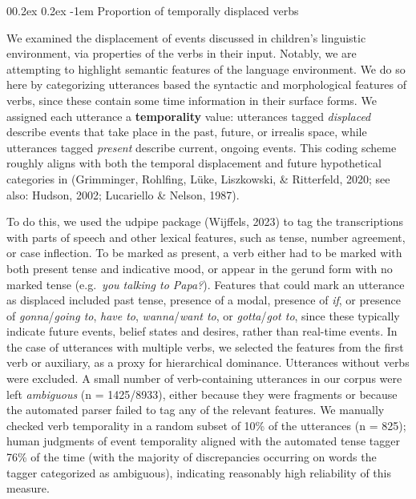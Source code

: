 \documentclass[
  man]{apa6}
\makeatletter
\let\oldparagraph\paragraph
\renewcommand{\paragraph}[1]{\oldparagraph{#1}\mbox{}}
\renewcommand{\paragraph}{\@startsection{paragraph}{4}{\parindent}%
  {0\baselineskip \@plus 0.2ex \@minus 0.2ex}%
  {-1em}%
  {\normalfont\normalsize\bfseries\itshape\typesectitle}}
\makeatother
\begin{document}
\hypertarget{proportion-of-temporally-displaced-verbs}{%
\paragraph{Proportion of temporally displaced verbs}\label{proportion-of-temporally-displaced-verbs}}

We examined the displacement of events discussed in children's linguistic environment, via properties of the verbs in their input. Notably, we are attempting to highlight semantic features of the language environment. We do so here by categorizing utterances based the syntactic and morphological features of verbs, since these contain some time information in their surface forms. We assigned each utterance a \textbf{temporality} value: utterances tagged \emph{displaced} describe events that take place in the past, future, or irrealis space, while utterances tagged \emph{present} describe current, ongoing events. This coding scheme roughly aligns with both the temporal displacement and future hypothetical categories in (Grimminger, Rohlfing, Lüke, Liszkowski, \& Ritterfeld, 2020; see also: Hudson, 2002; Lucariello \& Nelson, 1987).

To do this, we used the udpipe package (Wijffels, 2023) to tag the transcriptions with parts of speech and other lexical features, such as tense, number agreement, or case inflection. To be marked as present, a verb either had to be marked with both present tense and indicative mood, or appear in the gerund form with no marked tense (e.g.~\emph{you talking to Papa?}). Features that could mark an utterance as displaced included past tense, presence of a modal, presence of \emph{if}, or presence of \emph{gonna}/\emph{going to}, \emph{have to}, \emph{wanna}/\emph{want to}, or \emph{gotta}/\emph{got to}, since these typically indicate future events, belief states and desires, rather than real-time events. In the case of utterances with multiple verbs, we selected the features from the first verb or auxiliary, as a proxy for hierarchical dominance. Utterances without verbs were excluded. A small number of verb-containing utterances in our corpus were left \emph{ambiguous} (n = 1425/8933), either because they were fragments or because the automated parser failed to tag any of the relevant features. We manually checked verb temporality in a random subset of 10\% of the utterances (n = 825); human judgments of event temporality aligned with the automated tense tagger 76\% of the time (with the majority of discrepancies occurring on words the tagger categorized as ambiguous), indicating reasonably high reliability of this measure.
\end{document}
